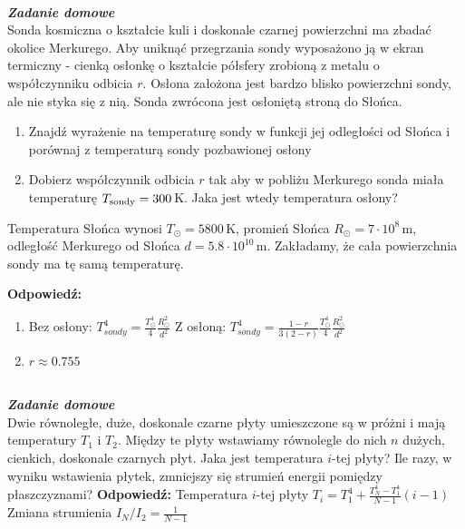 \documentclass[11pt,a4paper]{article}
\newcounter{zaddom}\newcommand{\zaddom}[1][]{\addtocounter{zaddom}{1} ~\\  {\bf \emph{Zadanie domowe \arabic{zaddom} #1 }} \\}
\begin{document}
\zaddom
Sonda kosmiczna o kształcie kuli i doskonale czarnej powierzchni ma zbadać okolice Merkurego. Aby uniknąć
przegrzania sondy wyposażono ją w ekran termiczny - cienką osłonkę o kształcie półsfery zrobioną z metalu
o współczynniku odbicia $r$. Osłona założona jest bardzo blisko powierzchni sondy, ale nie styka się z nią. Sonda
zwrócona jest osłoniętą stroną do Słońca.
\begin{enumerate}
\item Znajdź wyrażenie na temperaturę sondy w funkcji jej odległości od Słońca i porównaj z temperaturą sondy
pozbawionej osłony
\item Dobierz współczynnik odbicia $r$ tak aby w pobliżu Merkurego sonda miała temperaturę $T_{\rm sondy}= 300$\,K. 
Jaka jest wtedy temperatura osłony?
\end{enumerate}
Temperatura Słońca wynosi $T_\odot= 5800$\,K, promień Słońca $R_\odot = 7 \cdot 10^8$\,m, 
odległość Merkurego od Słońca $d = 5.8 \cdot 10^{10}$\,m. 
Zakładamy, że cała powierzchnia sondy ma tę samą temperaturę.

\vskip 10pt
\textbf{Odpowiedź:}
\begin{enumerate}
\item Bez osłony: $T_{sondy}^4 = \frac{T_\odot^4}{4} \frac{R_\odot^2}{d^2}$
Z osłoną: $T_{sondy}^4 = \frac{1-r}{3(2-r)} \frac{T_\odot^4}{4} \frac{R_\odot^2}{d^2}$
\item $r \approx 0.755$
\end{enumerate}

\zaddom
Dwie równoległe, duże, doskonale czarne płyty umieszczone są w próżni i mają temperatury $T_1$ i $T_2$.
Między te płyty wstawiamy równolegle do nich $n$ dużych, cienkich, doskonale czarnych płyt.
Jaka jest temperatura $i$-tej płyty? 
Ile razy, w wyniku wstawienia płytek, zmniejszy się strumień energii pomiędzy płaszczyznami? 
\vskip 10pt
\textbf{Odpowiedź:}
Temperatura $i$-tej płyty $T_i = T_1^4 + \frac{T_N^4-T_1^4}{N-1} (i-1)$\\
Zmiana strumienia $I_N/I_2 = \frac{1}{N-1} $
\end{document}
